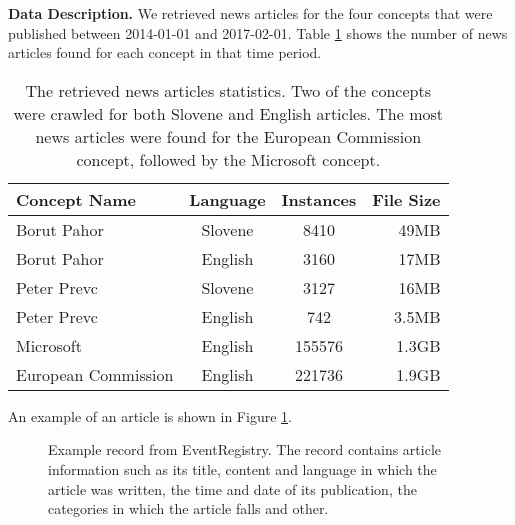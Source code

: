 \documentclass{acm_proc_article-sp}
\begin{document}
\textbf{Data Description.}
We retrieved news articles for the four concepts that were published between 2014-01-01 and 2017-02-01. Table \ref{table:concept-stats} shows the number of news articles found for each concept in that time period.

\begin{table}[!htb]
	\centering
    \begin{tabular}{|l|c|c|r|}
    	\hline
    	Concept Name & Language & Instances & File Size \\
        \hline
        Borut Pahor         & Slovene & 8410   & 49MB \\
        Borut Pahor         & English & 3160   & 17MB \\
        Peter Prevc         & Slovene & 3127   & 16MB \\
        Peter Prevc         & English & 742    & 3.5MB \\
        Microsoft           & English & 155576 & 1.3GB \\
        European Commission & English & 221736 & 1.9GB \\
        \hline
    \end{tabular}
    \caption{The retrieved news articles statistics. Two of the concepts were crawled for both Slovene and English articles. The most news articles were found for the European Commission concept, followed by the Microsoft concept.} \label{table:concept-stats}
\end{table}

 An example of an article is shown in Figure \ref{fig:dataset}.

\begin{figure}[!htb]
\centering
{}
\caption{Example record from EventRegistry. The record contains article information such as its title, content and language in which the article was written, the time and date of its publication, the categories in which the article falls and other.}
\label{fig:dataset}
\end{figure}


\end{document}
